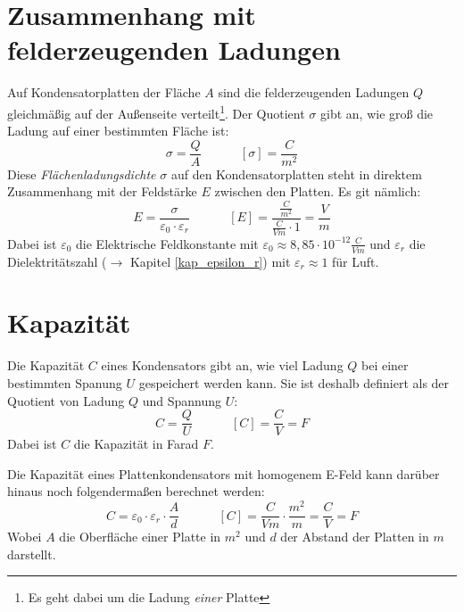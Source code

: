 		\section{Zusammenhang mit felderzeugenden Ladungen}	
Auf Kondensatorplatten der Fläche \(A\) sind die felderzeugenden Ladungen \(Q\) gleichmäßig auf der Außenseite verteilt\footnote{Es geht dabei um die Ladung \textit{einer} Platte}. Der Quotient \(\sigma\) gibt an, wie groß die Ladung auf einer bestimmten Fläche ist:
	\begin{equation}
	\sigma = \frac{Q}{A} ~~~~~~~~~~~~~~ [\sigma] = \frac{C}{m^2}
	\label{def_sigma}
	\end{equation}	
Diese \textit{Flächenladungsdichte} \(\sigma\) auf den Kondensatorplatten steht in direktem Zusammenhang mit der Feldstärke \(E\) zwischen den Platten. Es git nämlich:
	\begin{equation}
	E = \frac{\sigma}{\varepsilon_0 \cdot \varepsilon_r} ~~~~~~~~~~~~~~ [E] = \frac{\frac{C}{m^2}}{\frac{C}{Vm} \cdot 1} = \frac{V}{m}
	\end{equation}
Dabei ist \(\varepsilon_0\) die Elektrische Feldkonstante mit \(\varepsilon_0 \approx 8,85 \cdot 10^{-12} \frac{C}{Vm}\) und \(\varepsilon_r\) die Dielektritätszahl (\(\rightarrow\) Kapitel \ref{kap_epsilon_r})  mit \(\varepsilon_r \approx 1\) für Luft.


		\section{Kapazität}
Die Kapazität \(C\) eines Kondensators gibt an, wie viel Ladung \(Q\) bei einer bestimmten Spanung \(U\) gespeichert werden kann. Sie ist deshalb definiert als der Quotient von Ladung \(Q\) und Spannung \(U\):
	\begin{equation}
	C = \frac{Q}{U} ~~~~~~~~~~~~~~ [C] = \frac{C}{V} = F
	\label{def_C}
	\end{equation}
Dabei ist \(C\) die Kapazität in Farad \(F\). 

Die Kapazität eines Plattenkondensators mit homogenem E-Feld kann darüber hinaus noch folgendermaßen berechnet werden:
	\begin{equation}
	C = \varepsilon_0 \cdot \varepsilon_r \cdot \frac{A}{d} ~~~~~~~~~~~~~~ [C] = \frac{C}{Vm} \cdot \frac{m^2}{m} = \frac{C}{V} = F
	\label{C_kondensator}
	\end{equation}
Wobei \(A\) die Oberfläche einer Platte in \(m^2\) und \(d\) der Abstand der Platten in \(m\) darstellt.


